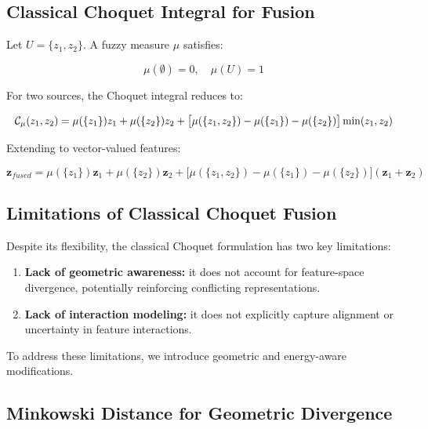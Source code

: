 \documentclass[12pt]{article}
\begin{document}
\subsection{Classical Choquet Integral for Fusion}

Let $U = \{z_1, z_2\}$. A fuzzy measure $\mu$ satisfies:

\begin{equation*}
\mu(\emptyset)=0,\quad \mu(U)=1
\end{equation*}

For two sources, the Choquet integral reduces to:

\begin{equation*}
\resizebox{\columnwidth}{!}{$
\mathcal{C}_\mu(z_1,z_2)
=
\mu(\{z_1\})z_1
+
\mu(\{z_2\})z_2
+
\big[\mu(\{z_1,z_2\}) - \mu(\{z_1\}) - \mu(\{z_2\})\big]
\min(z_1,z_2)
$}
\end{equation*}

Extending to vector-valued features:

\begin{equation*}
\mathbf{z}_{fused}
=
\mu(\{z_1\})\mathbf{z}_1
+
\mu(\{z_2\})\mathbf{z}_2
+
\big[\mu(\{z_1,z_2\}) - \mu(\{z_1\}) - \mu(\{z_2\})\big]
(\mathbf{z}_1 + \mathbf{z}_2)
\end{equation*}



\subsection{Limitations of Classical Choquet Fusion}

Despite its flexibility, the classical Choquet formulation has two key limitations:

\begin{enumerate}
    \item \textbf{Lack of geometric awareness:} it does not account for feature-space divergence, potentially reinforcing conflicting representations.
    \item \textbf{Lack of interaction modeling:} it does not explicitly capture alignment or uncertainty in feature interactions.
\end{enumerate}

To address these limitations, we introduce geometric and energy-aware modifications.

\subsection{Minkowski Distance for Geometric Divergence}
\end{document}
